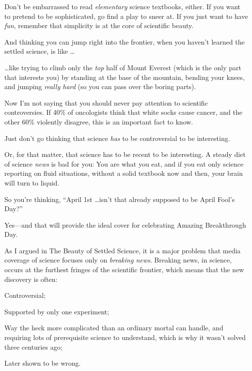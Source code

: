 {
 Don't be embarrassed to read \textit{elementary}
science textbooks, either. If you want to pretend to be sophisticated,
go find a play to sneer at. If you just want to have \textit{fun},
remember that simplicity is at the core of scientific beauty.}

{
 And thinking you can jump right into the frontier, when you
haven't learned the settled science, is like \ldots}

{
 \ldots like trying to climb only the \textit{top} half of Mount
Everest (which is the only part that interests you) by standing at the
base of the mountain, bending your knees, and jumping \textit{really
hard} (so you can pass over the boring parts).}

{
 Now I'm not saying that you should never pay
attention to scientific controversies. If 40\% of oncologists think
that white socks cause cancer, and the other 60\% violently disagree,
this is an important fact to know.}

{
 Just don't go thinking that science \textit{has}
to be controversial to be interesting.}

{
 Or, for that matter, that science has to be recent to be
interesting. A steady diet of science \textit{news} is bad for you: You
are what you eat, and if you eat only science reporting on fluid
situations, without a solid textbook now and then, your brain will turn
to liquid.}

\myendsectiontext


{
 So you're thinking, ``April 1st
\ldots isn't that already supposed to be April
Fool's Day?'' }

{
 Yes---and that will provide the ideal cover for celebrating
Amazing Breakthrough Day.}

{
 As I argued in The Beauty of Settled Science, it is a major
problem that media coverage of science focuses only on \textit{breaking
news}. Breaking news, in science, occurs at the furthest fringes of the
scientific frontier, which means that the new discovery is often:}

{
 Controversial;}

{
 Supported by only one experiment;}

{
 Way the heck more complicated than an ordinary mortal can handle,
and requiring lots of prerequisite science to understand, which is why
it wasn't solved three centuries ago;}

{
 Later shown to be wrong.}

